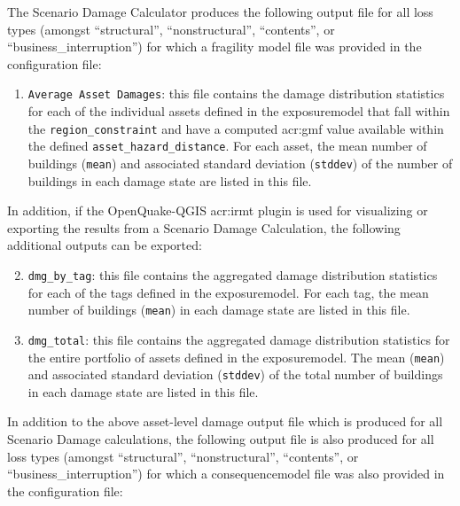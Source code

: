 The Scenario Damage Calculator produces the following output file for
all loss types (amongst ``structural'', ``nonstructural'', ``contents'', or
``business\_interruption'') for which a fragility model file was provided in
the configuration file:

\begin{enumerate}

  \item \Verb+Average Asset Damages+: this file contains the damage distribution
    statistics for each of the individual \glspl{asset} defined in the
    \gls{exposuremodel} that fall within the \Verb+region_constraint+ and have
    a computed \gls{acr:gmf} value available within the defined
    \Verb+asset_hazard_distance+. For each \gls{asset}, the mean number of
    buildings (\Verb+mean+) and associated standard deviation (\Verb+stddev+)
    of the number of buildings in each damage state are listed in this file.

\end{enumerate}

In addition, if the OpenQuake-QGIS \gls{acr:irmt} plugin is used for
visualizing or exporting the results from a Scenario Damage Calculation, the
following additional outputs can be exported:

\begin{enumerate}
\setcounter{enumi}{1}

  \item \Verb+dmg_by_tag+: this file contains the aggregated damage
    distribution statistics for each of the \glspl{tag} defined in the
    \gls{exposuremodel}. For each \gls{tag}, the mean number of
    buildings (\Verb+mean+) in each damage state are listed in this file.

  \item \Verb+dmg_total+: this file contains the aggregated damage
    distribution statistics for the entire portfolio of \glspl{asset} defined
    in the \gls{exposuremodel}. The mean (\Verb+mean+) and associated standard
    deviation (\Verb+stddev+) of the total number of buildings in each
    damage state are listed in this file.

\end{enumerate}

In addition to the above asset-level damage output file which is
produced for all Scenario Damage calculations, the following output file is
also produced for all loss types
(amongst ``structural'', ``nonstructural'', ``contents'', or
``business\_interruption'') for which a \gls{consequencemodel} file was also
provided in the configuration file:

